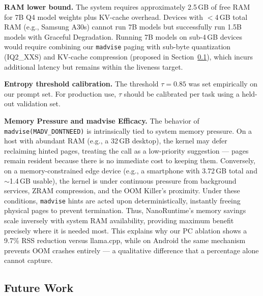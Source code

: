 \documentclass[11pt]{article}
\begin{document}
\textbf{RAM lower bound.}
The system requires approximately 2.5\,GB of free RAM for 7B Q4 model weights
plus KV-cache overhead. Devices with $<$4\,GB total RAM (e.g., Samsung A30s)
cannot run 7B models but successfully run 1.5B models with Graceful Degradation.
Running 7B models on sub-4\,GB devices would require combining our
\texttt{madvise} paging with sub-byte quantization (IQ2\_XXS) and
KV-cache compression (proposed in Section~\ref{sec:future}), which
incurs additional latency but remains within the liveness target.

\textbf{Entropy threshold calibration.}
The threshold $\tau = 0.85$ was set empirically on our prompt set.
For production use, $\tau$ should be calibrated per task using a
held-out validation set.

\textbf{Memory Pressure and madvise Efficacy.}
The behavior of \texttt{madvise(MADV\_DONTNEED)} is intrinsically tied to
system memory pressure. On a host with abundant RAM (e.g., a 32\,GB desktop),
the kernel may defer reclaiming hinted pages, treating the call as a
low-priority suggestion — pages remain resident because there is no immediate
cost to keeping them. Conversely, on a memory-constrained edge device
(e.g., a smartphone with 3.72\,GB total and $\sim$1.4\,GB usable),
the kernel is under continuous pressure from background services, ZRAM
compression, and the OOM Killer's proximity. Under these conditions,
\texttt{madvise} hints are acted upon deterministically, instantly freeing
physical pages to prevent termination. Thus, NanoRuntime's memory savings
scale inversely with system RAM availability, providing maximum benefit
precisely where it is needed most. This explains why our PC ablation
shows a 9.7\% RSS reduction versus llama.cpp, while on Android the same
mechanism prevents OOM crashes entirely — a qualitative difference that
a percentage alone cannot capture.

\subsection{Future Work}
\label{sec:future}
\end{document}
